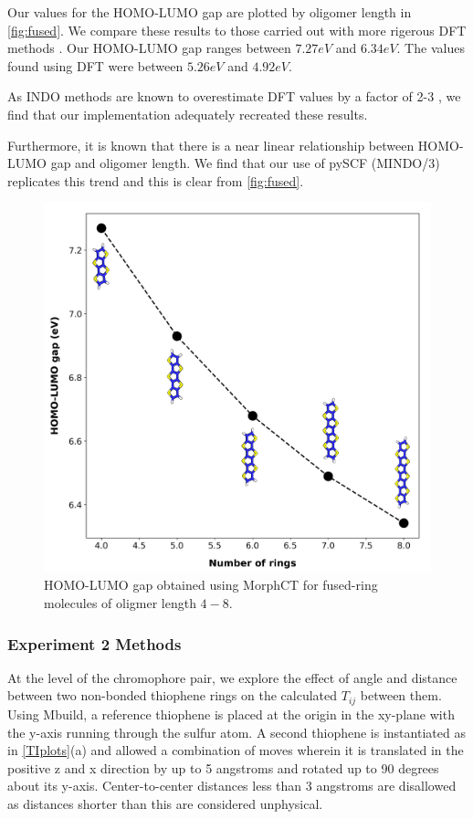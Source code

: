 Our values for the HOMO-LUMO gap are plotted by oligomer length in \autoref{fig:fused}. We compare these
results to those carried out with more rigerous DFT methods \cite{Arago2010}. Our HOMO-LUMO gap ranges between
$7.27eV$ and $6.34eV$. The values found using DFT were between $5.26eV$ and $4.92eV$. 

As INDO methods are known to overestimate DFT values by a factor of 2-3 \cite{Gorelsky2001}, we find that our
implementation adequately recreated these results.

Furthermore, it is known that there is a near linear
relationship between HOMO-LUMO gap and oligomer length. We find that our use of pySCF (MINDO/3) replicates
this trend and this is clear from \autoref{fig:fused}.

\begin{figure}
  \center
  \includegraphics[width = .8\textwidth]{figures/fused-ring-figure.png}
  \caption{HOMO-LUMO gap obtained using MorphCT for fused-ring molecules of oligmer length $4-8$.}
  \label{fig:fused}
\end{figure}

\subsubsection{Experiment 2 Methods}

At the level of the chromophore pair, we explore the effect of angle and distance between two non-bonded
thiophene rings on the calculated $T_{ij}$ between them.
Using Mbuild, a reference thiophene is placed at the origin in the xy-plane
with the y-axis running through the sulfur atom. 
A second thiophene is instantiated as in \autoref{TIplots}(a)
and allowed a combination of moves wherein it is translated
in the positive z and x direction by up to 5 angstroms 
and rotated up to 90 degrees about its y-axis. Center-to-center distances less
than 3 angstroms are disallowed as distances shorter than this are considered
unphysical.

